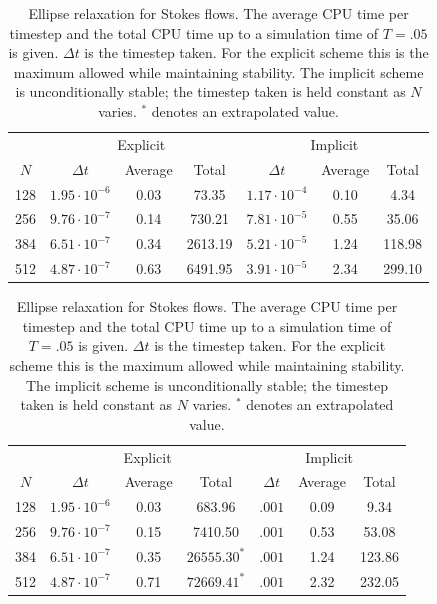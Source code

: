 \documentclass[preprint,12pt]{elsarticle}
\begin{document}
\begin{table}
\caption{Ellipse relaxation for convective flows. The average CPU time per timestep and the total CPU time up to a simulation time of $T=.05$ is given. $\Delta t$ is the timestep taken and is the maximum allowed while maintaining stability.}
\label{table:EllipseConvectiveSims}
\begin{center}
\begin{tabular}{|c |c c c| c c c|}
\hline
& \multicolumn{3}{c|}{Explicit} & \multicolumn{3}{c|}{Implicit}\\
$N$ & $\Delta t$ & Average & Total & $\Delta t$ & Average & Total\\
\hline
128 & $1.95\cdot 10^{-6}$ & 0.03 & 73.35 & $1.17\cdot 10^{-4}$ & 0.10 & 4.34 \\
256 & $9.76\cdot 10^{-7}$ & 0.14 & 730.21 & $7.81\cdot 10^{-5}$ & 0.55 & 35.06\\
384 & $6.51\cdot 10^{-7}$ & 0.34 & 2613.19 & $5.21\cdot 10^{-5}$ & 1.24 & 118.98\\
512 & $4.87\cdot 10^{-7}$ & 0.63 & 6491.95 & $3.91\cdot 10^{-5}$ & 2.34 & 299.10\\
\hline
\end{tabular}
\end{center}

\caption{Ellipse relaxation for Stokes flows. The average CPU time per timestep and the total CPU time up to a simulation time of $T=.05$ is given. $\Delta t$ is the timestep taken. For the explicit scheme this is the maximum allowed while maintaining stability. The implicit scheme is unconditionally stable; the timestep taken is held constant as $N$ varies.  $^*$ denotes an extrapolated value.}
\label{table:EllipseStokesSims}
\begin{center}
\begin{tabular}{|c |c c c| c c c|}
\hline
& \multicolumn{3}{|c|}{Explicit} & \multicolumn{3}{|c|}{Implicit}\\
$N$ & $\Delta t$ & Average & Total & $\Delta t$ & Average & Total\\
\hline
128 & $1.95\cdot 10^{-6}$ & 0.03 & 683.96 & $.001$ & 0.09 & 9.34\\
256 & $9.76\cdot 10^{-7}$ & 0.15 & 7410.50 & $.001$ & 0.53 &  53.08\\
384 & $6.51\cdot 10^{-7}$ & 0.35 & $26555.30^*$ & $.001$ & 1.24 & 123.86\\
512 & $4.87\cdot 10^{-7}$ & 0.71 & $72669.41^*$ & $.001$ & 2.32 & 232.05\\
\hline
\end{tabular}
\end{center}
\end{table}
\end{document}

